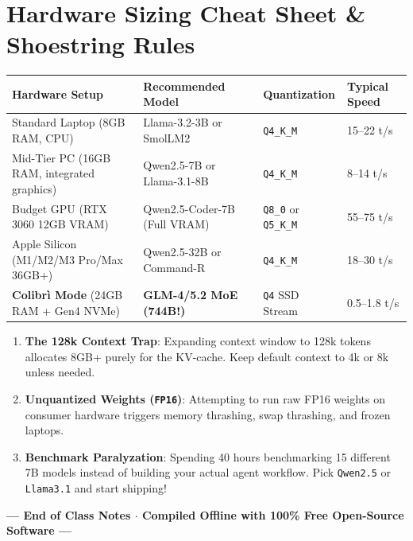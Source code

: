 \documentclass[11pt,a4paper]{article}
\begin{document}
\section{Hardware Sizing Cheat Sheet \& Shoestring Rules}
\begin{center}
\small
\begin{tabular}{llll}
\toprule
\textbf{Hardware Setup} & \textbf{Recommended Model} & \textbf{Quantization} & \textbf{Typical Speed} \\
\midrule
Standard Laptop (8GB RAM, CPU) & Llama-3.2-3B or SmolLM2 & \texttt{Q4\_K\_M} & 15--22 t/s \\
Mid-Tier PC (16GB RAM, integrated graphics) & Qwen2.5-7B or Llama-3.1-8B & \texttt{Q4\_K\_M} & 8--14 t/s \\
Budget GPU (RTX 3060 12GB VRAM) & Qwen2.5-Coder-7B (Full VRAM) & \texttt{Q8\_0} or \texttt{Q5\_K\_M} & 55--75 t/s \\
Apple Silicon (M1/M2/M3 Pro/Max 36GB+) & Qwen2.5-32B or Command-R & \texttt{Q4\_K\_M} & 18--30 t/s \\
\textbf{Colibr\`i Mode} (24GB RAM + Gen4 NVMe) & \textbf{GLM-4/5.2 MoE (744B!)} & \texttt{Q4} SSD Stream & 0.5--1.8 t/s \\
\bottomrule
\end{tabular}
\end{center}

\begin{gotcha}
    \begin{enumerate}
        \item \textbf{The 128k Context Trap}: Expanding context window to 128k tokens allocates 8GB+ purely for the KV-cache. Keep default context to 4k or 8k unless needed.
        \item \textbf{Unquantized Weights (\texttt{FP16})}: Attempting to run raw FP16 weights on consumer hardware triggers memory thrashing, swap thrashing, and frozen laptops.
        \item \textbf{Benchmark Paralyzation}: Spending 40 hours benchmarking 15 different 7B models instead of building your actual agent workflow. Pick \texttt{Qwen2.5} or \texttt{Llama3.1} and start shipping!
    \end{enumerate}
\end{gotcha}

\vspace{0.4cm}
\begin{center}
    \textbf{\color{ShoeNavy}--- End of Class Notes $\cdot$ Compiled Offline with 100\% Free Open-Source Software ---}
\end{center}
\end{document}
